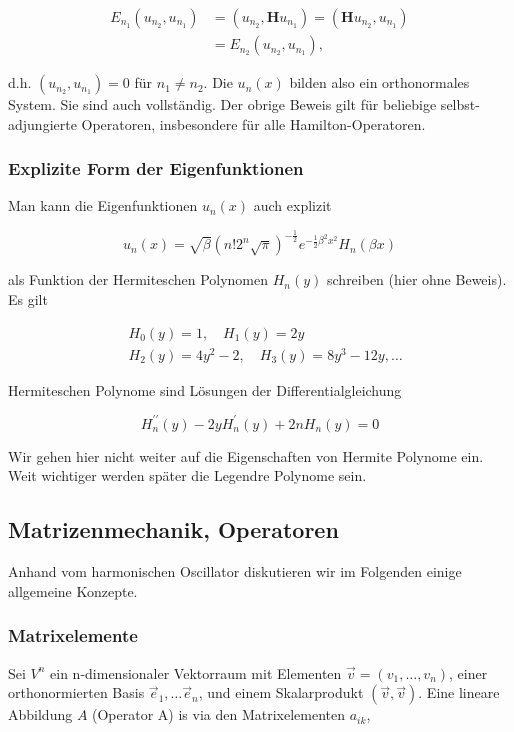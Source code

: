 \documentclass[10pt, letterpaper]{article}
\begin{document}
$$
\begin{aligned}
E_{n_{1}}\left(u_{n_{2}}, u_{n_{1}}\right) & =\left(u_{n_{2}}, \mathbf{H} u_{n_{1}}\right)=\left(\mathbf{H} u_{n_{2}}, u_{n_{1}}\right) \\
& =E_{n_{2}}\left(u_{n_{2}}, u_{n_{1}}\right),
\end{aligned}
$$

d.h. $\left(u_{n_{2}}, u_{n_{1}}\right)=0$ für $n_{1} \neq n_{2}$. Die $u_{n}(x)$ bilden also ein orthonormales System. Sie sind auch vollständig. Der obrige Beweis gilt für beliebige selbst-adjungierte Operatoren, insbesondere für alle Hamilton-Operatoren.

\subsubsection*{Explizite Form der Eigenfunktionen}
Man kann die Eigenfunktionen $u_{n}(x)$ auch explizit

$$
u_{n}(x)=\sqrt{\beta}\left(n!2^{n} \sqrt{\pi}\right)^{-\frac{1}{2}} e^{-\frac{1}{2} \beta^{2} x^{2}} H_{n}(\beta x)
$$

als Funktion der Hermiteschen Polynomen $H_{n}(y)$ schreiben (hier ohne Beweis). Es gilt

$$
\begin{aligned}
& H_{0}(y)=1, \quad H_{1}(y)=2 y \\
& H_{2}(y)=4 y^{2}-2, \quad H_{3}(y)=8 y^{3}-12 y, \ldots
\end{aligned}
$$

Hermiteschen Polynome sind Lösungen der Differentialgleichung

$$
H_{n}^{\prime \prime}(y)-2 y H_{n}^{\prime}(y)+2 n H_{n}(y)=0
$$

Wir gehen hier nicht weiter auf die Eigenschaften von Hermite Polynome ein. Weit wichtiger werden später die Legendre Polynome sein.

\subsection*{Matrizenmechanik, Operatoren}
Anhand vom harmonischen Oscillator diskutieren wir im Folgenden einige allgemeine Konzepte.

\subsubsection*{Matrixelemente}
Sei $V^{n}$ ein n-dimensionaler Vektorraum mit Elementen $\vec{v}=\left(v_{1}, \ldots, v_{n}\right)$, einer orthonormierten Basis $\vec{e}_{1}, \ldots \vec{e}_{n}$, und einem Skalarprodukt $(\vec{v}, \vec{v})$. Eine lineare Abbildung $A$ (Operator A) is via den Matrixelementen $a_{i k}$,
\end{document}
